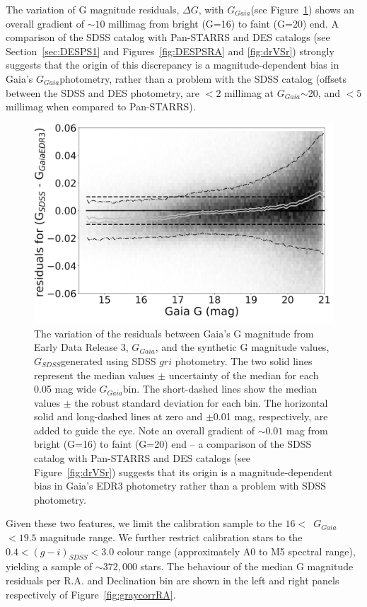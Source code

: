 \documentclass[fleqn,usenatbib]{mnras}
\newcommand{\GG}{\hbox{$G_{Gaia}$}}
\newcommand{\GS}{\hbox{$G_{SDSS}$}}
\begin{document}
The variation of G magnitude residuals, $\Delta G$, with \GG (see Figure~\ref{fig:gaiaJump}) shows 
an overall gradient of $\sim10$ millimag from bright (G=16) to faint (G=20) end. 
A comparison of the SDSS catalog with Pan-STARRS and DES catalogs (see 
Section~\ref{sec:DESPS1} and Figures~\ref{fig:DESPSRA} and \ref{fig:drVSr}) strongly suggests that the
origin of this discrepancy is a magnitude-dependent bias in Gaia's \GG photometry,
rather than a problem with the SDSS catalog (offsets between the SDSS and DES
photometry,  are $<2$ millimag at \GG$\sim$20, and $<5$ millimag when
compared to Pan-STARRS). 


\begin{figure}
    \centering\includegraphics[width=0.95\columnwidth]{figures/GmagCorrectionTest_Gmag_Hess_lr.png} 
\caption{The variation of the residuals between Gaia's G magnitude from Early Data Release 3, \GG,
and the synthetic G magnitude values, \GS generated using SDSS $gri$ photometry. The two solid 
lines represent the median values $\pm$ uncertainty of the median for each
0.05 mag wide \GG bin. The short-dashed lines show the median values $\pm$ 
the robust standard deviation for each bin. The horizontal solid and long-dashed 
lines at zero and $\pm$0.01 mag, respectively, are added to guide the eye.
Note an overall gradient of $\sim0.01$ mag from bright (G=16) to faint (G=20) 
end -- a comparison of the SDSS catalog with Pan-STARRS and DES catalogs (see 
Figure~\ref{fig:drVSr}) suggests that its origin is a magnitude-dependent bias in
 Gaia's EDR3 photometry rather than a problem with SDSS photometry.}
\label{fig:gaiaJump}
\end{figure}


Given these two features, we limit the calibration sample to the $16<$~\GG~$<19.5$
magnitude range. We further restrict calibration stars to the $0.4 < (g-i)_{SDSS} < 3.0$ colour 
range (approximately A0 to M5 spectral range), yielding a sample of $\sim372,000$ stars. 
The behaviour of the median G magnitude residuals per R.A. and Declination bin are shown in 
the left and right panels respectively of Figure~\ref{fig:graycorrRA}.
\end{document}
